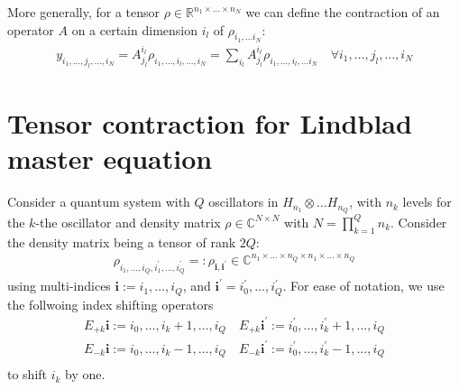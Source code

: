 \documentclass[letterpaper]{article}
\newcommand{\R}{\mathds{R}}
\newcommand{\C}{\mathds{C}}
\newcommand{\bfi}{\boldsymbol{i}}
\begin{document}
More generally, for a tensor $\rho \in \R^{n_1\times \dots \times n_N}$ we can define the contraction of an operator $A$ on a certain dimension $i_l$ of $\rho_{i_1,\dots i_N}$:
\begin{align}
    y_{i_1,\dots,j_l,\dots,i_N} = A_{j_l}^{i_l} \rho_{i_1,\dots,i_l,\dots,i_N} = \sum_{i_l} A_{j_l}^{i_l} \rho_{i_1,\dots,i_l,\dots i_N} \quad \forall i_1,\dots, j_l,\dots,i_N
\end{align}



\section{Tensor contraction for Lindblad master equation}
Consider a quantum system with $Q$ oscillators in $H_{n_1} \otimes \dots H_{n_Q}$, with $n_k$ levels for the $k$-the oscillator and density matrix $\rho \in \C^{N\times N}$ with $N=\prod_{k=1}^{Q} n_k$. Consider the density matrix being a tensor of rank $2Q$: 
\begin{align}
    \rho_{i_1,\dots, i_Q, i_1^{\prime}, \dots, i_Q^{\prime}} =: \rho_{\bfi, \bfi^\prime}\in\C^{n_1\times \dots \times n_Q \times n_1 \times \dots \times n_Q}
\end{align}
using multi-indices $\bfi := i_{1},\dots,i_{Q}$, and $\bfi^\prime = i_0^\prime, \dots, i_Q^\prime$. For ease of notation, we use the follwoing index shifting operators 
\begin{align}
  E_{+k} \bfi := i_0,\dots, i_{k}+1, \dots, i_Q \quad E_{+k} \bfi^\prime := i_0^\prime, \dots, i_k^\prime + 1, \dots, i_Q\\
  E_{-k} \bfi := i_0,\dots, i_{k}-1, \dots, i_Q \quad E_{-k} \bfi^\prime := i_0^\prime, \dots, i_k^\prime - 1, \dots, i_Q\\
\end{align}
to shift $i_k$ by one. 
\end{document}
